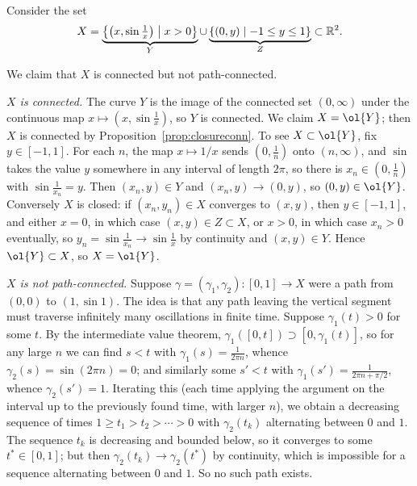 \documentclass[a4paper]{scrartcl}
\begin{document}
\begin{example}\label{ex:sinecurve}
    Consider the set
    $$
    X = \underbrace{\left\{ \left(x, \sin \tfrac{1}{x}\right) \;\middle|\; x > 0 \right\}}_{Y} \cup \underbrace{\{(0, y) \mid -1 \leq y \leq 1\}}_{Z} \subset \mathbb{R}^2.
    $$

    \begin{center}
    \end{center}

    We claim that $X$ is connected but not path-connected.

    \emph{$X$ is connected.} The curve $Y$ is the image of the connected set $(0, \infty)$ under the continuous map $x \mapsto (x, \sin \frac{1}{x})$, so $Y$ is connected. We claim $X = \ol{Y}$; then $X$ is connected by Proposition~\ref{prop:closureconn}. To see $X \subset \ol{Y}$, fix $y \in [-1, 1]$. For each $n$, the map $x \mapsto 1/x$ sends $(0, \frac{1}{n})$ onto $(n, \infty)$, and $\sin$ takes the value $y$ somewhere in any interval of length $2\pi$, so there is $x_n \in (0, \frac{1}{n})$ with $\sin \frac{1}{x_n} = y$. Then $(x_n, y) \in Y$ and $(x_n, y) \rightarrow (0, y)$, so $(0, y) \in \ol{Y}$. Conversely $X$ is closed: if $(x_n, y_n) \in X$ converges to $(x, y)$, then $y \in [-1, 1]$, and either $x = 0$, in which case $(x, y) \in Z \subset X$, or $x > 0$, in which case $x_n > 0$ eventually, so $y_n = \sin\frac{1}{x_n} \rightarrow \sin \frac{1}{x}$ by continuity and $(x, y) \in Y$. Hence $\ol{Y} \subset X$, so $X = \ol{Y}$.

    \emph{$X$ is not path-connected.} Suppose $\gamma = (\gamma_1, \gamma_2): [0, 1] \rightarrow X$ were a path from $(0, 0)$ to $(1, \sin 1)$. The idea is that any path leaving the vertical segment must traverse infinitely many oscillations in finite time. Suppose $\gamma_1(t) > 0$ for some $t$. By the intermediate value theorem, $\gamma_1([0, t]) \supset [0, \gamma_1(t)]$, so for any large $n$ we can find $s < t$ with $\gamma_1(s) = \frac{1}{2\pi n}$, whence $\gamma_2(s) = \sin(2 \pi n) = 0$; and similarly some $s' < t$ with $\gamma_1(s') = \frac{1}{2\pi n + \pi/2}$, whence $\gamma_2(s') = 1$. Iterating this (each time applying the argument on the interval up to the previously found time, with larger $n$), we obtain a decreasing sequence of times $1 \geq t_1 > t_2 > \cdots > 0$ with $\gamma_2(t_k)$ alternating between $0$ and $1$. The sequence $t_k$ is decreasing and bounded below, so it converges to some $t^* \in [0, 1]$; but then $\gamma_2(t_k) \rightarrow \gamma_2(t^*)$ by continuity, which is impossible for a sequence alternating between $0$ and $1$. So no such path exists.
\end{example}
\end{document}
